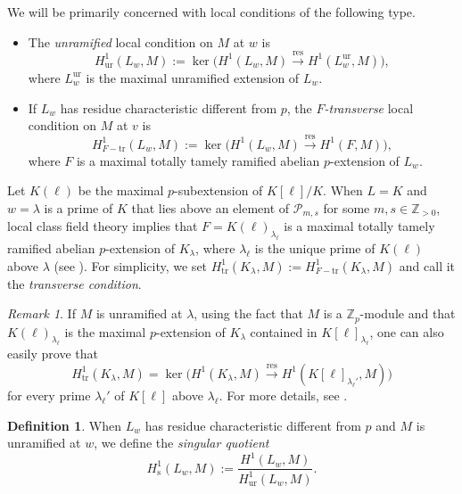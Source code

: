 \documentclass[12pt,reqno]{amsart}
\theoremstyle{definition}
\newtheorem{definition}[theorem]{Definition}
\theoremstyle{remark}
\newtheorem{remark}[theorem]{Remark}
\newcommand{\numberset}{\mathbb}
\newcommand{\Z}{\numberset{Z}}
\DeclareMathOperator{\res}{res}
\newcommand{\tr}{\mathrm{tr}}
\newcommand{\s}{\mathrm{s}}
\newcommand{\ur}{\mathrm{ur}}
\newcommand{\gl}{\lambda}
\begin{document}
 We will be primarily concerned with local conditions of the following type.
 \begin{itemize}
     \item[(i)] The \emph{unramified} local condition on $M$ at $w$ is
     \begin{equation*}
         H^1_{\ur}(L_w,M):=\ker\big(H^1(L_w,M)\xrightarrow{\res} H^1(L_w^{\ur},M)\big),
     \end{equation*}
     where $L_w^{\ur}$ is the maximal unramified extension of $L_w$. 
     \item[(ii)] If  $L_w$ has residue characteristic different from $p$, the \emph{$F$-transverse} local condition on $M$ at $v$ is
     \begin{equation*}
         H^1_{F-\tr}(L_w,M):=\ker\big(H^1(L_w,M)\xrightarrow{\res} H^1(F,M)\big),
     \end{equation*}
     where $F$ is a maximal totally tamely ramified abelian $p$-extension of $L_w$.
\end{itemize}

Let $K(\ell)$ be the maximal $p$-subextension of $K[\ell]/K$. When $L=K$ and $w=\gl$ is a prime of $K$ that lies above an element of $\mathcal{P}_{m,s}$ for some $m,s\in\Z_{>0}$, local class field theory implies that $F=K(\ell)_{\lambda_\ell}$ is a maximal totally tamely ramified abelian $p$-extension of $K_\gl$, where $\gl_\ell$ is the unique prime of $K(\ell)$ above $\gl$ (see \cite[Lemma 4.1.21]{Zerman24:PhD-thesis}). For simplicity, we set $H^1_{\tr}(K_\gl,M):=H^1_{F-\tr}(K_\gl,M)$ and call it the \emph{transverse condition}.
    
    \begin{remark}
    \label{rk:transverse-condition}    
        If $M$ is unramified at $\gl$, using the fact that $M$ is a $\Z_p$-module and that $K(\ell)_{\lambda_\ell}$ is the maximal $p$-extension of $K_\gl$ contained in $K[\ell]_{\gl_\ell}$, one can also easily prove that
        \begin{equation*}
         H^1_{\tr}(K_\gl,M)=\ker\big(H^1(K_\gl,M)\xrightarrow{\res} H^1(K[\ell]_{\gl_\ell'},M)\big)
     \end{equation*}
     for every prime $\gl_\ell'$ of $K[\ell]$ above $\gl_\ell$. For more details, see \cite[Lemma 4.2.8]{Zerman24:PhD-thesis}.
    \end{remark}

    \begin{definition}
         When $L_w$ has residue characteristic different from $p$ and $M$ is unramified at $w$, we define the \emph{singular quotient} 
         \begin{equation*}
             H_{\s}^1(L_w,M):=\frac{H^1(L_w,M)}{H_{\ur}^1(L_w,M)}.
         \end{equation*}
    \end{definition}
\end{document}
